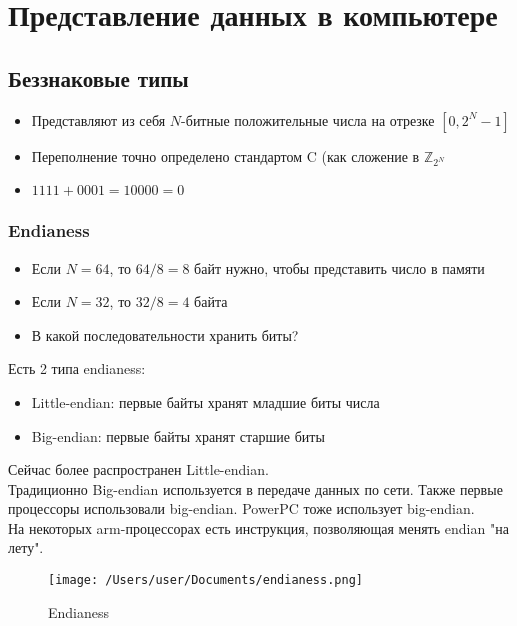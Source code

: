 \section{Представление данных в компьютере}
  \subsection{Беззнаковые типы}
  \begin{itemize}
    \item Представляют из себя $N$-битные положительные числа на отрезке $[0, 2^N - 1]$
    \item Переполнение точно определено стандартом C (как сложение в $\mathbb{Z}_{2^N}$
    \item $1111+0001=10000=0$
  \end{itemize}
    
  \subsubsection{Endianess}
    \begin{itemize}
      \item Если $N = 64$, то $64 / 8 = 8$ байт нужно, чтобы представить число в памяти
      \item Если $N = 32$, то $32 / 8 = 4$ байта
      \item В какой последовательности хранить биты?
    \end{itemize}
    
    Есть 2 типа endianess:
    \begin{itemize}
      \item Little-endian: первые байты хранят младшие биты числа
      \item Big-endian: первые байты хранят старшие биты
    \end{itemize}
    Сейчас более распространен Little-endian.\\    Традиционно Big-endian используется в передаче данных по сети. Также первые процессоры использовали big-endian. PowerPC тоже использует big-endian.\\
    На некоторых arm-процессорах есть инструкция, позволяющая менять endian "на лету". 
    
\begin{figure}[h!]
  \texttt{[image: /Users/user/Documents/endianess.png]}
  \caption{Endianess}
  \label{fig:endianess}
\end{figure}

    

